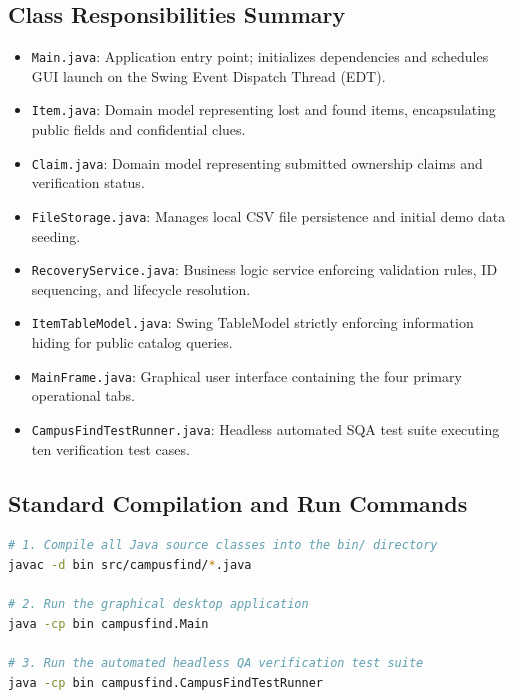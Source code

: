 \documentclass[11pt,a4paper]{article}
\begin{document}
\subsection{Class Responsibilities Summary}
\begin{itemize}
    \item \texttt{Main.java}: Application entry point; initializes dependencies and schedules GUI launch on the Swing Event Dispatch Thread (EDT).
    \item \texttt{Item.java}: Domain model representing lost and found items, encapsulating public fields and confidential clues.
    \item \texttt{Claim.java}: Domain model representing submitted ownership claims and verification status.
    \item \texttt{FileStorage.java}: Manages local CSV file persistence and initial demo data seeding.
    \item \texttt{RecoveryService.java}: Business logic service enforcing validation rules, ID sequencing, and lifecycle resolution.
    \item \texttt{ItemTableModel.java}: Swing TableModel strictly enforcing information hiding for public catalog queries.
    \item \texttt{MainFrame.java}: Graphical user interface containing the four primary operational tabs.
    \item \texttt{CampusFindTestRunner.java}: Headless automated SQA test suite executing ten verification test cases.
\end{itemize}

\subsection{Standard Compilation and Run Commands}
\begin{lstlisting}[language=bash]
# 1. Compile all Java source classes into the bin/ directory
javac -d bin src/campusfind/*.java

# 2. Run the graphical desktop application
java -cp bin campusfind.Main

# 3. Run the automated headless QA verification test suite
java -cp bin campusfind.CampusFindTestRunner
\end{lstlisting}
\end{document}
